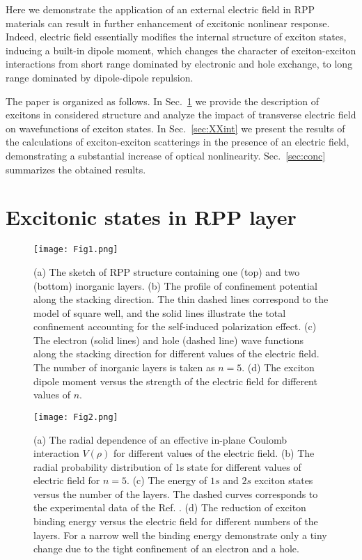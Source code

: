\documentclass[prb,twocolumn,preprintnumbers,superscriptaddress]{revtex4}
\begin{document}

Here we demonstrate the application of an external electric field in  RPP materials can result in further enhancement of excitonic nonlinear response. 
Indeed, electric field essentially modifies the internal structure of exciton states,  inducing a built-in dipole moment, which changes the character of exciton-exciton interactions from short range dominated by electronic and hole exchange, to long range dominated by dipole-dipole repulsion.

The paper is organized as follows. 
In Sec.~\ref{sec:exciton} we provide the description of excitons in considered structure and analyze the impact of transverse electric field on wavefunctions of exciton states. 
In Sec.~\ref{sec:XXint} we present the results of the calculations of exciton-exciton scatterings in the presence of an electric field, demonstrating a substantial increase of optical nonlinearity.
Sec.~\ref{sec:conc} summarizes the obtained results.

\section{Excitonic states in RPP layer}\label{sec:exciton}
%
\begin{figure}
    \texttt{[image: Fig1.png]}
    \caption{(a) The sketch of RPP structure containing one (top) and two (bottom) inorganic layers. 
    (b) The profile of confinement potential along the stacking direction. The thin dashed lines correspond to the model of square well, and the solid lines illustrate the total confinement accounting for the self-induced polarization effect. 
    (c) The electron (solid lines) and hole (dashed line) wave functions along the stacking direction for different values of the electric field. The number of inorganic layers is taken as $n=5$. 
    (d) The exciton dipole moment versus the strength of the electric field for different values of $n$. 
    }
    \label{fig:psi_z}
\end{figure}
%
%
\begin{figure}
    \texttt{[image: Fig2.png]}
    \caption{
    (a) The radial dependence of an effective in-plane Coulomb interaction $V(\rho)$ for different values of the electric field.
    (b) The radial probability distribution of 1s state 
    for different values of electric field for $n=5$. 
    (c) The energy of $1s$ and $2s$ exciton states versus the number of the layers. The dashed curves corresponds to the experimental data of the Ref. \cite{Blancon2018}.
    (d) The reduction of exciton binding energy versus the electric field for different numbers of the layers.
    For a narrow well the binding energy demonstrate only a tiny change due to the tight confinement of an electron and a hole.
    }
    \label{fig:Xrho}
\end{figure}
%
\end{document}
